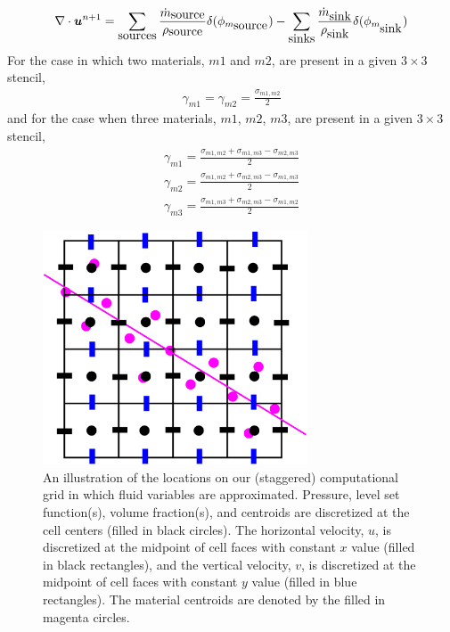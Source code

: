 \documentclass[]{article}
\newcommand{\bmu}{\mbox{\boldmath $u$\unboldmath}}
\begin{document}
\begin{itemize}
\begin{eqnarray*}
  \nabla \cdot \bmu^{n+1} = 
   \sum_{\mbox{sources}} 
   \frac{\dot{m}_{\mbox{source}}}
        {\rho_{\mbox{source}}}\delta(\phi_{m_{\mbox{source}}}) -
   \sum_{\mbox{sinks}} 
   \frac{\dot{m}_{\mbox{sink}}}
        {\rho_{\mbox{sink}}}\delta(\phi_{m_{\mbox{sink}}}) 
  \end{eqnarray*}
  For the case in which two materials, $m1$ and $m2$,
  are present in a given $3\times 3$
  stencil,
  \begin{eqnarray*}
  \gamma_{m1}=\gamma_{m2}=\frac{\sigma_{m1,m2}}{2} 
  \end{eqnarray*}
  and for the case when three materials, $m1$, $m2$, $m3$, are
  present in a given $3\times 3$ stencil,
  \begin{eqnarray*}
  \gamma_{m1}=\frac{\sigma_{m1,m2}+\sigma_{m1,m3}-\sigma_{m2,m3}}{2} 
  \end{eqnarray*}
  \begin{eqnarray*}
  \gamma_{m2}=\frac{\sigma_{m1,m2}+\sigma_{m2,m3}-\sigma_{m1,m3}}{2} 
  \end{eqnarray*}
  \begin{eqnarray*}
  \gamma_{m3}=\frac{\sigma_{m1,m3}+\sigma_{m2,m3}-\sigma_{m1,m2}}{2} 
  \end{eqnarray*}

\end{itemize}


\begin{figure}[htbp] 
  \centering
    \includegraphics[width=0.7\textwidth]{stag_uniform.eps}
  \caption{
   An illustration of the locations on our 
   (staggered) computational grid
   in which fluid variables are approximated.
   Pressure, level set function(s), volume fraction(s), and 
   centroids are discretized at the cell centers (filled in black circles).
   The horizontal velocity, $u$, 
   is discretized at the midpoint of cell faces
   with constant $x$ value (filled in black rectangles), and the 
   vertical velocity, $v$,
   is discretized at the midpoint of cell faces with constant $y$ value
   (filled in blue rectangles).
   The material centroids are denoted by the filled in magenta circles.
   }
  \label{fig:ch2_nodeslocation} 
\end{figure}
\end{document}
